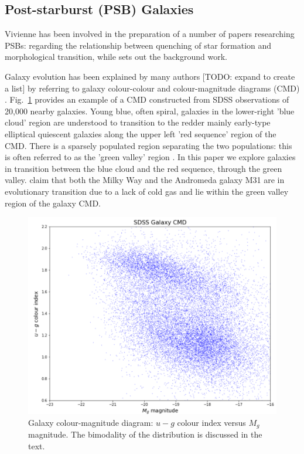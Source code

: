 \subsection{Post-starburst (PSB) Galaxies}
\label{sec:PSBs}
Vivienne has been involved in the preparation of a number of papers researching PSBs: \citet{2017MNRAS.472.1401A} regarding the relationship between quenching of star formation and morphological transition, while \citet{2016MNRAS.463..832W} sets out the background work.
\par Galaxy evolution has been explained by many authors [TODO: expand to create a list] \citep{baldry2004quantifying,2006MNRAS.373..469B} by referring to galaxy colour-colour and colour-magnitude diagrams (CMD) \citep[see e.g.][]{2001AJ....122.1861S, 2003ApJ...585L...5H, 2003ApJS..149..289B}. Fig.~\ref{fig:CMD1} provides an example of a CMD constructed from SDSS observations of 20,000 nearby galaxies. Young blue, often spiral, galaxies in the lower-right 'blue cloud' region are understood to transition to the redder mainly early-type elliptical quiescent galaxies along the upper left 'red sequence' region of the CMD. There is a sparsely populated region separating the two populations: this is often referred to as the 'green valley' region \citep{2004ApJ...608..752B}. In this paper we explore galaxies in transition between the blue cloud and the red sequence, through the green valley.
\citet{Mutch_2011} claim that both the Milky Way and the Andromeda galaxy M31 are in evolutionary transition due to a lack of cold gas and lie within the green valley region of the galaxy CMD.

\begin{figure}
	\includegraphics[width=\columnwidth]{images/CMDs/galaxyCMD.PNG}
    \caption{Galaxy colour-magnitude diagram: $u-g$ colour index versus $M_g$ magnitude. The bimodality of the distribution is discussed in the text.}
    \label{fig:CMD1}
\end{figure}